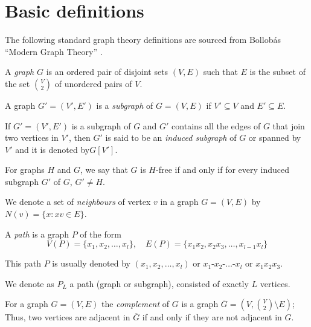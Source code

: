 \section{Basic definitions}
The following standard graph theory definitions are sourced from Bollobás ``Modern Graph Theory'' \cite{Bollobs2002ModernGT}.

\begin{definition}[graph]
  A \emph{graph} $G$ is an ordered pair of disjoint sets $(V, E)$ such that $E$ is the subset of the set $V \choose 2$ of unordered pairs of $V$.
\end{definition}

\begin{definition}[subgraph]
  A graph $G' = (V', E')$ is a \emph{subgraph} of $G = (V, E)$ if $V' \subseteq V$ and $E' \subseteq E$.
\end{definition}

\begin{definition}
  If $G' = (V', E')$ is a subgraph of $G$ and $G'$ contains all the edges of $G$ that join two vertices in $V'$, then $G'$ is said to be an \emph{induced subgraph} of $G$ or spanned by  $V'$ and it is denoted by$G[V']$.
\end{definition}

\begin{definition}
    For graphs $H$ and $G$, we say that $G$ is $H$-free if and only if for every induced subgraph $G'$ of $G$, $G' \ne H$.
\end{definition}

\begin{definition}[neighbours]
    We denote a set of \emph{neighbours} of vertex $v$ in a graph $G = (V, E)$ by $N(v) = \{x : xv \in E\}$.
\end{definition}

\begin{definition}[path]
  A \emph{path} is a graph $P$ of the form \[ V(P) = \{x_1, x_2, \ldots, x_l\},\quad E(P) = \{x_1x_2, x_2x_3, \ldots, x_{l-1}x_l\} \]

  This path $P$ is usually denoted by $(x_1, x_2, \ldots, x_l)$ or $x_1$-$x_2$-$\ldots$-$x_l$ or $x_1 x_2 x_3$.
\end{definition}

We denote as $P_L$  a path (graph or subgraph), consisted of exactly $L$ vertices.

\begin{definition}[complement]
  For a graph $G = (V, E)$ the \emph{complement} of $G$ is a graph $\overline{G} = (V, {V \choose 2} \setminus E)$; Thus, two vertices are adjacent in $\overline{G}$ if and only if they are not adjacent in $G$.
\end{definition}

